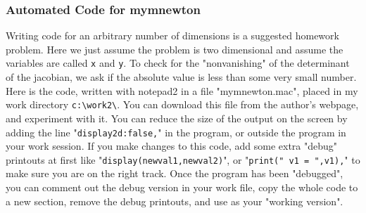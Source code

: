 \documentclass[12pt]{article}
\begin{document}
\subsubsection{Automated Code for mymnewton}
Writing code for an arbitrary number of dimensions is a suggested homework problem.
Here we just assume the problem is two dimensional and assume the variables
  are called \verb|x| and \verb|y|.
To check for the "nonvanishing" of the determinant of the jacobian,
   we ask if the absolute value is less than some very small number.
Here is the code, written with notepad2 in a file "mymnewton.mac", 
  placed in my work directory \verb|c:\work2\|.
You can download this file from the author's webpage, and experiment with it.
You can reduce the size of the output on the screen by adding the line
  "\verb|display2d:false,|" in the program, or outside the program in your work
  session.
If you make changes to this code, add some extra "debug" printouts at first
  like "\verb|display(newval1,newval2)|", or "\verb|print(" v1 = ",v1),|"
  to make sure you are on the right track.
Once the program has been "debugged", you can comment out the debug version in your
 work file, copy the whole code to a new section, remove the debug printouts,
  and use as your "working version".
\small
\end{document}
